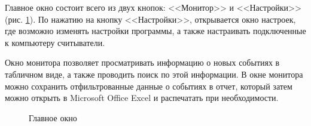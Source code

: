 ﻿Главное окно состоит всего из двух кнопок: <<Монитор>> и <<Настройки>> (рис. \ref{i:main}).
По нажатию на кнопку <<Настройки>>, открывается окно настроек, где возможно изменять настройки программы, 
а также настраивать подключенные к компьютеру считыватели. 

Окно монитора позволяет просматривать информацию
о новых событиях в табличном виде, а также проводить поиск по этой информации. В окне монитора
можно сохранить отфильтрованные данные о событиях в отчет, который затем можно открыть в Microsoft Office 
Excel и распечатать при необходимости.

\begin{figure}[h]
    \caption{Главное окно}
    \label{i:main}
\end{figure}

